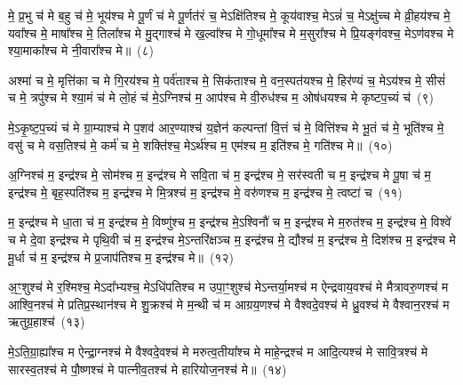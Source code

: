 मे॒ प्र॒भु च॑ मे ब॒हु च॑ मे॒ भूय॑श्च मे पू॒र्णं च॑ मे पू॒र्णत॑रं च॒ मे\-ऽक्षि॑तिश्च मे॒ कूय॑वाश्च॒ मे\-ऽन्नं॑ च॒ मे\-ऽक्षु॑च्च मे व्री॒हय॑श्च मे॒ यवा᳚श्च मे॒ माषा᳚श्च मे॒ तिला᳚श्च मे मु॒द्गाश्च॑ मे ख॒ल्वा᳚श्च मे गो॒धूमा᳚श्च मे म॒सुरा᳚श्च मे प्रि॒यङ्ग॑वश्च॒ मे\-ऽण॑वश्च मे श्या॒माका᳚श्च मे नी॒वारा᳚श्च मे॥~(८)

{\anuvakamend[{वि॒भु च॑ म॒सुरा॒श्चतु॑र्दश च}]}%

अश्मा॑ च मे॒ मृत्ति॑का च मे गि॒रय॑श्च मे॒ पर्व॑ताश्च मे॒ सिक॑ताश्च मे॒ वन॒स्पत॑यश्च मे॒ हिर॑ण्यं च॒ मे\-ऽय॑श्च मे॒ सीसं॑ च मे॒ त्रपु॑श्च मे श्या॒मं च॑ मे लो॒हं च॑ मे॒\-ऽग्निश्च॑ म॒ आप॑श्च मे वी॒रुध॑श्च म॒ ओष॑धयश्च मे कृष्टप॒च्यं च॑~(९)

मे॒\-ऽकृ॒ष्ट॒प॒च्यं च॑ मे ग्रा॒म्याश्च॑ मे प॒शव॑ आर॒ण्याश्च॑ य॒ज्ञेन॑ कल्पन्तां वि॒त्तं च॑ मे॒ वित्ति॑श्च मे भू॒तं च॑ मे॒ भूति॑श्च मे॒ वसु॑ च मे वस॒तिश्च॑ मे॒ कर्म॑ च मे॒ शक्ति॑श्च॒ मे\-ऽर्थ॑श्च म॒ एम॑श्च म॒ इति॑श्च मे॒ गति॑श्च मे॥~(१०)

{\anuvakamend[{कृ॒ष्ट॒प॒च्यञ्चा॒ष्टाच॑त्वारिꣳशच्च}]}%

अ॒ग्निश्च॑ म॒ इन्द्र॑श्च मे॒ सोम॑श्च म॒ इन्द्र॑श्च मे सवि॒ता च॑ म॒ इन्द्र॑श्च मे॒ सर॑स्वती च म॒ इन्द्र॑श्च मे पू॒षा च॑ म॒ इन्द्र॑श्च मे॒ बृह॒स्पति॑श्च म॒ इन्द्र॑श्च मे मि॒त्रश्च॑ म॒ इन्द्र॑श्च मे॒ वरु॑णश्च म॒ इन्द्र॑श्च मे॒ त्वष्टा॑ च~(११)

म॒ इन्द्र॑श्च मे धा॒ता च॑ म॒ इन्द्र॑श्च मे॒ विष्णु॑श्च म॒ इन्द्र॑श्च मे॒\-ऽश्विनौ॑ च म॒ इन्द्र॑श्च मे म॒रुत॑श्च म॒ इन्द्र॑श्च मे॒ विश्वे॑ च मे दे॒वा इन्द्र॑श्च मे पृथि॒वी च॑ म॒ इन्द्र॑श्च मे॒\-ऽन्तरि॑क्षञ्च म॒ इन्द्र॑श्च मे॒ द्यौश्च॑ म॒ इन्द्र॑श्च मे॒ दिश॑श्च म॒ इन्द्र॑श्च मे मू॒र्धा च॑ म॒ इन्द्र॑श्च मे प्र॒जा\-प॑तिश्च म॒ इन्द्र॑श्च मे॥~(१२)

{\anuvakamend[{त्वष्टा॑ च॒ द्यौश्च॑ म॒ एक॑विꣳशतिश्च}]}%

अ॒ꣳ॒शुश्च॑ मे र॒श्मिश्च॒ मे\-ऽदा᳚भ्यश्च॒ मे\-ऽधि॑पतिश्च म उपा॒ꣳ॒शुश्च॑ मे\-ऽन्तर्या॒मश्च॑ म ऐन्द्रवाय॒वश्च॑ मे मैत्रावरु॒णश्च॑ म आश्वि॒नश्च॑ मे प्रतिप्र॒स्थान॑श्च मे शु॒क्रश्च॑ मे म॒न्थी च॑ म आग्रय॒णश्च॑ मे वैश्वदे॒वश्च॑ मे ध्रु॒वश्च॑ मे वैश्वान॒रश्च॑ म ऋतुग्र॒हाश्च॑~(१३)

मे॒\-ऽति॒ग्रा॒ह्या᳚श्च म ऐन्द्रा॒ग्नश्च॑ मे वैश्वदे॒वश्च॑ मे मरुत्व॒तीया᳚श्च मे माहे॒न्द्रश्च॑ म आदि॒त्यश्च॑ मे सावि॒त्रश्च॑ मे सारस्व॒तश्च॑ मे पौ॒ष्णश्च॑ मे पात्नीव॒तश्च॑ मे हारियोज॒नश्च॑ मे॥~(१४)

{\anuvakamend[{ऋ॒तु॒ग्र॒हाश्च॒ चतु॑स्त्रिꣳशच्च}]}%

